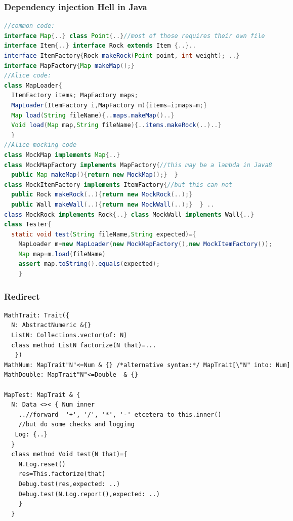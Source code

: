 \begin{frame}[fragile]
\frametitle{Dependency injection Hell in Java}
\begin{NiceCode}{59ex}{0.7}
\begin{lstlisting}[language=Java, morekeywords={assert}]
//common code: 
interface Map{..} class Point{..}//most of those requires their own file
interface Item{..} interface Rock extends Item {..}..
interface ItemFactory{Rock makeRock(Point point, int weight); ..}
interface MapFactory{Map makeMap();}
//Alice code: 
class MapLoader{
  ItemFactory items; MapFactory maps;
  MapLoader(ItemFactory i,MapFactory m){items=i;maps=m;}
  Map load(String fileName){..maps.makeMap()..}
  Void load(Map map,String fileName){..items.makeRock(..)..}
  }
//Alice mocking code
class MockMap implements Map{..}
class MockMapFactory implements MapFactory{//this may be a lambda in Java8
  public Map makeMap(){return new MockMap();}  }
class MockItemFactory implements ItemFactory{//but this can not
  public Rock makeRock(..){return new MockRock(..);}
  public Wall makeWall(..){return new MockWall(..);}  } ..
class MockRock implements Rock{..} class MockWall implements Wall{..}
class Tester{
  static void test(String fileName,String expected)={
    MapLoader m=new MapLoader(new MockMapFactory(),new MockItemFactory());
    Map map=m.load(fileName)
    assert map.toString().equals(expected);
    }
\end{lstlisting}
\end{NiceCode}
\end{frame}


\begin{frame}[fragile]
\frametitle{Redirect}
\begin{NiceCode}{59ex}{0.7}
\begin{lstlisting}
MathTrait: Trait({
  N: AbstractNumeric &{}
  ListN: Collections.vector(of: N)
  class method ListN factorize(N that)=...
   })
MathNum: MapTrait"N"<=Num & {} /*alternative syntax:*/ MapTrait[\"N" into: Num]
MathDouble: MapTrait"N"<=Double  & {}

MapTest: MapTrait & {
  N: Data <>< { Num inner
    ..//forward  '+', '/', '*', '-' etcetera to this.inner()
    //but do some checks and logging
   Log: {..} 
  }
  class method Void test(N that)={
    N.Log.reset()
    res=This.factorize(that)
    Debug.test(res,expected: ..)
    Debug.test(N.Log.report(),expected: ..)
    }
  }
\end{lstlisting}
\end{NiceCode}
\end{frame}


